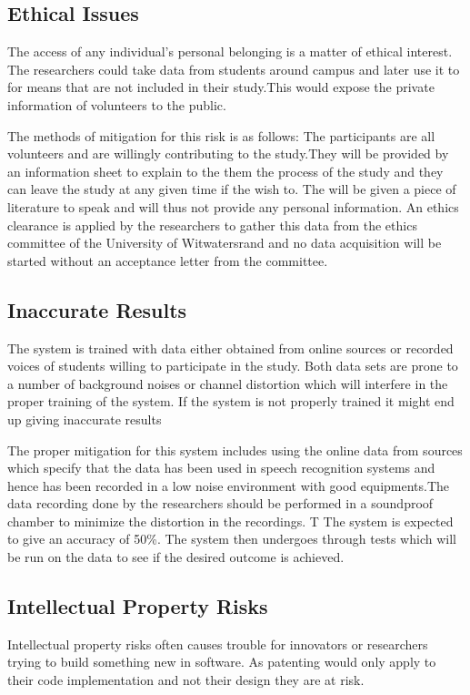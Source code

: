 \documentclass[10pt,twocolumn]{witseiepaper}
\begin{document}
\subsection{Ethical Issues}
The access of any individual's personal belonging is a matter of ethical interest.  The researchers could take data from students around campus and later use it to for means that are not included in their study.This would expose the private information of volunteers to the public. 

The methods of mitigation for this risk is as follows:
The participants are all volunteers and are willingly contributing to the study.They will be provided by an information sheet to explain to the them the process of the study and they can leave the study at any given time if the wish to. The will be given a piece of literature to speak and will thus not provide any personal information. An ethics clearance is applied by the researchers to gather this data from the ethics committee of the University of Witwatersrand and no data acquisition will be started without an acceptance letter from the committee.

\subsection{Inaccurate Results}
The system is trained with data either obtained from online sources or recorded voices of students willing to participate in the study. Both data sets are prone to a number of background noises or channel distortion which will interfere in the proper training of the system. If the system is not properly trained it might end up giving inaccurate results  

The proper mitigation for this system includes using the online data from sources which specify that the data has been used in speech recognition systems and hence has been recorded in a low noise environment with good equipments.The data recording done by the researchers should be performed in a soundproof chamber to minimize the distortion in the recordings. T The system is expected to give an accuracy of 50\%. The system then undergoes through tests which will be run on the data to see if the desired outcome is achieved.

\subsection{Intellectual Property Risks}
Intellectual property risks often causes trouble for innovators or researchers trying to build something new in software. As patenting would only apply to their code implementation and not their design they are at risk.
\end{document}

